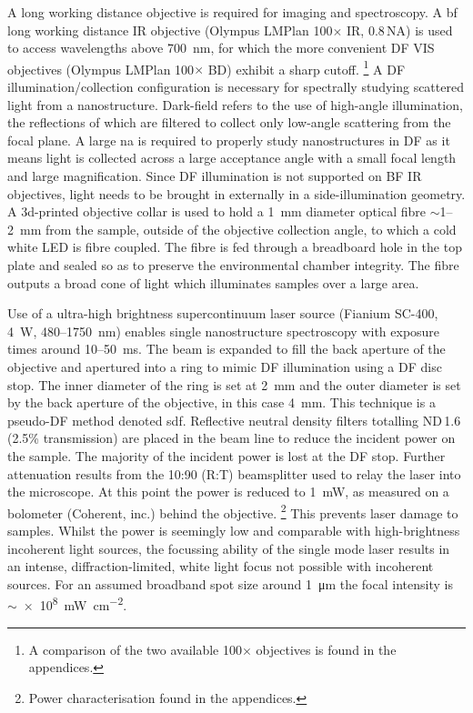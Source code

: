 \documentclass{article}
\begin{document}
A long working distance objective is required for imaging and spectroscopy. A \gls{bf} long working distance IR objective (Olympus LMPlan 100$\times$ IR, 0.8\,NA) is used to access wavelengths above \SI{700}{nm}, for which the more convenient DF VIS objectives (Olympus LMPlan 100$\times$ BD) exhibit a sharp cutoff.%
\footnote{A comparison of the two available 100$\times$ objectives is found in the appendices.}
A DF illumination/collection configuration is necessary for spectrally studying scattered light from a nanostructure. Dark-field refers to the use of high-angle illumination, the reflections of which are filtered to collect only low-angle scattering from the focal plane. A large \gls{na} is required to properly study nanostructures in DF as it means light is collected across a large acceptance angle with a small focal length and large magnification. Since DF illumination is not supported on BF IR objectives, light needs to be brought in externally in a side-illumination geometry. A 3d-printed objective collar is used to hold a \SI{1}{mm} diameter optical fibre $\sim$1--\SI{2}{mm} from the sample, outside of the objective collection angle, to which a cold white LED is fibre coupled. The fibre is fed through a breadboard hole in the top plate and sealed so as to preserve the environmental chamber integrity. The fibre outputs a broad cone of light which illuminates samples over a large area.

Use of a ultra-high brightness supercontinuum laser source (Fianium SC-400, \SI{4}{W}, 480--\SI{1750}{nm}) enables single nanostructure spectroscopy with exposure times around 10--\SI{50}{ms}. The beam is expanded to fill the back aperture of the objective and apertured into a ring to mimic DF illumination using a DF disc stop. The inner diameter of the ring is set at \SI{2}{mm} and the outer diameter is set by the back aperture of the objective, in this case \SI{4}{mm}. This technique is a pseudo-DF method denoted \gls{sdf}. %
Reflective neutral density filters totalling ND\,1.6 (2.5\% transmission) are placed in the beam line to reduce the incident power on the sample. The majority of the incident power is lost at the DF stop. Further attenuation results from the 10:90 (R:T) beamsplitter used to relay the laser into the microscope. At this point the power is reduced to \SI{1}{mW}, as measured on a bolometer (Coherent, inc.) behind the objective.%
\footnote{Power characterisation found in the appendices.}
This prevents laser damage to samples. Whilst the power is seemingly low and comparable with high-brightness incoherent light sources, the focussing ability of the single mode laser results in an intense, diffraction-limited, white light focus not possible with incoherent sources. For an assumed broadband spot size around \SI{1}{\micro\metre} the focal intensity is $\sim${\SI{e8}{\milli\watt\per\centi\metre\squared}}.
\end{document}
